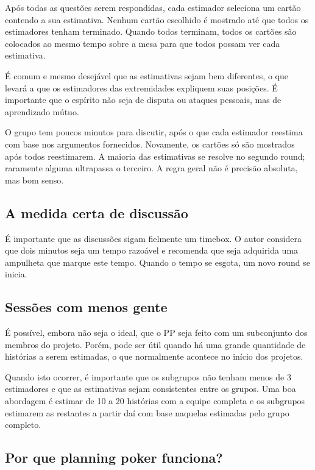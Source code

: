 \documentclass[a4paper,abntfigtabnum,noindentfirst]{abnt}
\begin{document}
Após todas as questões serem respondidas, cada estimador seleciona um cartão contendo a sua estimativa. Nenhum cartão escolhido é mostrado até que todos os estimadores tenham terminado. Quando todos terminam, todos os cartões são colocados ao mesmo tempo sobre a mesa para que todos possam ver cada estimativa.

É comum e mesmo desejável que as estimativas sejam bem diferentes, o que levará a que os estimadores das extremidades expliquem suas posições. É importante que o espírito não seja de disputa ou ataques pessoais, mas de aprendizado mútuo.

O grupo tem poucos minutos para discutir, após o que cada estimador reestima com base nos argumentos fornecidos. Novamente, os cartões só são mostrados após todos reestimarem. A maioria das estimativas se resolve no segundo round; raramente alguma ultrapassa o terceiro. A regra geral não é precisão absoluta, mas bom senso.

\subsection{A medida certa de discussão}

É importante que as discussões sigam fielmente um timebox. O autor considera que dois minutos seja um tempo razoável e recomenda que seja adquirida uma ampulheta que marque este tempo. Quando o tempo se esgota, um novo round se inicia.

\subsection{Sessões com menos gente}

É possível, embora não seja o ideal, que o PP seja feito com um subconjunto dos membros do projeto. Porém, pode ser útil quando há uma grande quantidade de histórias a serem estimadas, o que normalmente acontece no início dos projetos.

Quando isto ocorrer, é importante que os subgrupos não tenham menos de 3 estimadores e que as estimativas sejam consistentes entre os grupos. Uma boa abordagem é estimar de 10 a 20 histórias com a equipe completa e os subgrupos estimarem as restantes a partir daí com base naquelas estimadas pelo grupo completo.

\subsection{Por que planning poker funciona?}
\end{document}
